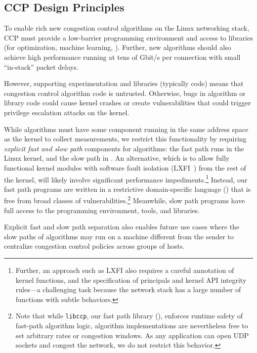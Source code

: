 \subsection{CCP Design Principles}
\label{s:datapath:isolation}

To enable rich new congestion control algorithms on the Linux networking stack,
CCP must provide a low-barrier programming environment and access
to libraries (\eg for optimization, machine learning, \etc).
%
Further, new algorithms should also achieve high performance running at tens of
Gbit/s per connection with small ``in-stack'' packet delays.

However, supporting experimentation and libraries (typically
\userspace code) means that congestion control algorithm code is untrusted.
Otherwise, bugs in algorithm or library code could cause kernel
crashes or create vulnerabilities that could trigger privilege escalation
attacks on the kernel.

 While algorithms must have
some component running in the same address space as the kernel to collect measurements,
we restrict this functionality by requiring {\em explicit fast and slow path} components for algorithms:
the fast path runs in the Linux kernel, and the slow path in \userspace.
%
An alternative, which is to allow fully functional kernel modules with software
fault isolation (\eg LXFI~\cite{lxfi}) from the rest of the kernel, will likely
involve significant performance impediments.\footnote{Further, an approach such as
LXFI also requires a careful annotation of kernel functions, and the
specification of principals and kernel API integrity rules---a challenging
task because the network stack has a large number of functions with subtle
behaviors.}
%
Instead, our fast path programs are written in a restrictive domain-specific language ()
that is free from broad classes of vulnerabilities.\footnote{Note that while \texttt{libccp}, our fast path library (), enforces runtime safety of fast-path algorithm logic,
algorithm implementations are nevertheless free to set arbitrary rates or congestion windows.
As any application can open UDP sockets and congest the network, we do not restrict this behavior.}
Meanwhile, slow path programs have full access to the \userspace programming environment,
tools, and libraries.

Explicit fast and slow path separation also enables future use cases where the
slow paths of algorithms may run on a machine different from the sender to
centralize congestion control policies across groups of hosts.

